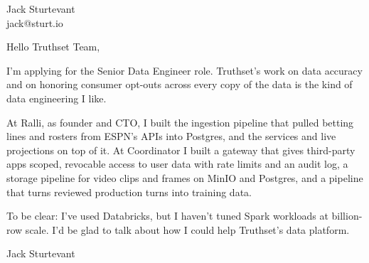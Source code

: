 \documentclass[11pt]{article}
\begin{document}
\raggedright

{\namefont\fontsize{20pt}{24pt}\selectfont Jack Sturtevant}\\[-0.3em]
jack@sturt.io

\vspace{1.2em}

Hello Truthset Team,

I'm applying for the Senior Data Engineer role. Truthset's work on data accuracy and on honoring consumer opt-outs across every copy of the data is the kind of data engineering I like.

At Ralli, as founder and CTO, I built the ingestion pipeline that pulled betting lines and rosters from ESPN's APIs into Postgres, and the services and live projections on top of it. At Coordinator I built a gateway that gives third-party apps scoped, revocable access to user data with rate limits and an audit log, a storage pipeline for video clips and frames on MinIO and Postgres, and a pipeline that turns reviewed production turns into training data.

To be clear: I've used Databricks, but I haven't tuned Spark workloads at billion-row scale. I'd be glad to talk about how I could help Truthset's data platform.

\vspace{0.6em}
Jack Sturtevant
\end{document}

